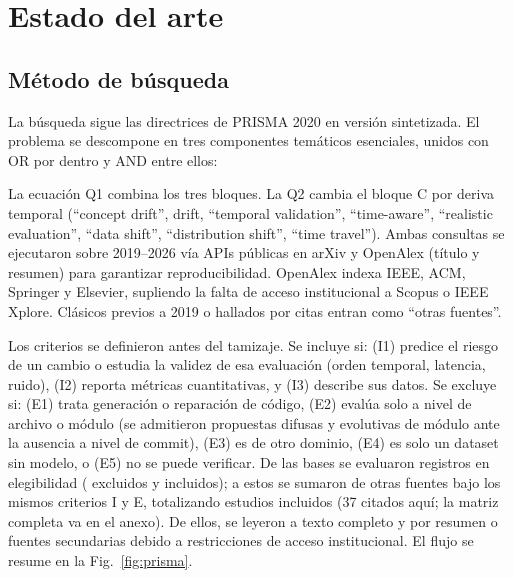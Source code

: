 \section{Estado del arte}

\subsection{Método de búsqueda}
La búsqueda sigue las directrices de PRISMA 2020 \cite{Page2021} en versión sintetizada. El problema se descompone en tres componentes temáticos esenciales, unidos con OR por dentro y AND entre ellos:

\noindent{}

\smallskip
La ecuación Q1 combina los tres bloques. La Q2 cambia el bloque C por deriva temporal (``concept drift'', drift, ``temporal validation'', ``time-aware'', ``realistic evaluation'', ``data shift'', ``distribution shift'', ``time travel''). Ambas consultas se ejecutaron sobre 2019--2026 vía APIs públicas en arXiv y OpenAlex (título y resumen) para garantizar reproducibilidad. OpenAlex indexa IEEE, ACM, Springer y Elsevier, supliendo la falta de acceso institucional a Scopus o IEEE Xplore. Clásicos previos a 2019 o hallados por citas entran como ``otras fuentes''.

Los criterios se definieron antes del tamizaje. Se incluye si: (I1) predice el riesgo de un cambio o estudia la validez de esa evaluación (orden temporal, latencia, ruido), (I2) reporta métricas cuantitativas, y (I3) describe sus datos. Se excluye si: (E1) trata generación o reparación de código, (E2) evalúa solo a nivel de archivo o módulo (se admitieron propuestas difusas y evolutivas de módulo ante la ausencia a nivel de commit), (E3) es de otro dominio, (E4) es solo un dataset sin modelo, o (E5) no se puede verificar. De las bases se evaluaron \nPasan{} registros en elegibilidad (\nExclTexto{} excluidos y \nIncluidosBases{} incluidos); a estos se sumaron \nOtros{} de otras fuentes bajo los mismos criterios I y E, totalizando \nTotalIncluidos{} estudios incluidos (37 citados aquí; la matriz completa va en el anexo). De ellos, \nTextoCompleto{} se leyeron a texto completo y \nSoloResumen{} por resumen o fuentes secundarias debido a restricciones de acceso institucional. El flujo se resume en la Fig.~\ref{fig:prisma}.

